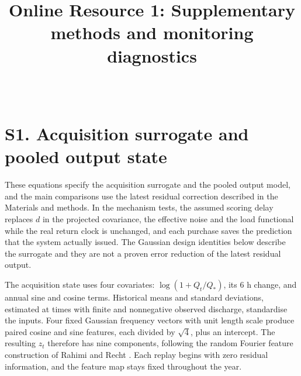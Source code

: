\documentclass[lineno,pdflatex,sn-apa]{sn-jnl}%
\theoremstyle{thmstyleone}%
\theoremstyle{thmstyletwo}%
\theoremstyle{thmstylethree}%
\begin{document}
\title[Online Resource 1]{Online Resource 1: Supplementary methods and monitoring diagnostics}



\author*[1,2]{ \,}










\maketitle



\section*{S1. Acquisition surrogate and pooled output state}

These equations specify the acquisition surrogate and the pooled output model, and the main comparisons use the latest residual correction described in the Materials and methods. In the mechanism tests, the assumed scoring delay replaces $d$ in the projected covariance, the effective noise and the load functional while the real return clock is unchanged, and each purchase saves the prediction that the system actually issued. The Gaussian design identities below describe the surrogate and they are not a proven error reduction of the latest residual output.

The acquisition state uses four covariates: $\log(1+Q_t/Q_*)$, its 6 h change, and annual sine and cosine terms. Historical means and standard deviations, estimated at times with finite and nonnegative observed discharge, standardise the inputs. Four fixed Gaussian frequency vectors with unit length scale produce paired cosine and sine features, each divided by $\sqrt{4}$, plus an intercept. The resulting $z_t$ therefore has nine components, following the random Fourier feature construction of Rahimi and Recht \citep{rahimi2007}. Each replay begins with zero residual information, and the feature map stays fixed throughout the year.
\end{document}

